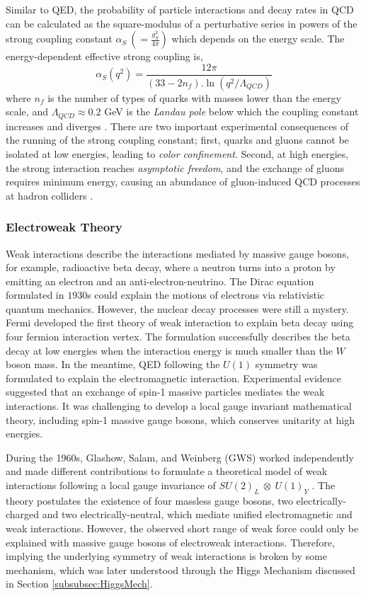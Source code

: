 Similar to QED, the probability of particle interactions and decay rates in QCD can be calculated as the square-modulus of a perturbative series in
powers of the strong coupling constant $\alpha _{S} ~(=\frac{g_{S}^2}{4\pi})$ which depends on the energy scale. The energy-dependent effective strong coupling is, 
\begin{equation}
    \alpha_{S}(q^2) = \frac{12\pi}{(33-2n_{f}).\ln(q^2/\Lambda_{QCD})}
\end{equation}
where $n_{f}$ is the number of types of quarks with masses lower than the energy scale, and $\Lambda_{QCD}\approx0.2$ GeV is the \textit{Landau pole} below which the coupling constant increases and diverges \cite{AlphaQCD}. There are two important experimental consequences of the running of the strong coupling constant; first, quarks and gluons cannot be isolated at low energies, leading to \textit{color confinement}. Second, at high energies, the strong interaction reaches \textit{asymptotic freedom}, and the exchange of gluons requires minimum energy, causing an abundance of gluon-induced QCD processes at hadron colliders \cite{AlphaQCD}. 

\subsubsection{Electroweak Theory}
\label{subsubsec:EWkUni}
Weak interactions describe the interactions mediated by massive gauge bosons, for example, radioactive beta decay, where a neutron turns into a proton by emitting an electron and an anti-electron-neutrino. The Dirac equation formulated in $1930$s could explain the motions of electrons via relativistic quantum mechanics. However, the nuclear decay processes were still a mystery. Fermi developed the first theory of weak interaction to explain beta decay using four fermion interaction vertex. The formulation successfully describes the beta decay at low energies when the interaction energy is much smaller than the $W$ boson mass. In the meantime, QED following the $U(1)$ symmetry was formulated to explain the electromagnetic interaction. Experimental evidence suggested that an exchange of spin-1 massive particles mediates the weak interactions. It was challenging to develop a local gauge invariant mathematical theory, including spin-1 massive gauge bosons, which conserves unitarity at high energies. 

During the 1960s, Glashow, Salam, and Weinberg (GWS) worked independently and made different contributions to formulate a theoretical model of weak interactions following a local gauge invariance of $SU(2)_{L}~\otimes~U(1)_{Y}$ \cite{GLASHOW1961579}\cite{EWK_W}\cite{EWK_S}. The theory postulates the existence of four massless gauge bosons, two electrically-charged and two electrically-neutral, which mediate unified electromagnetic and weak interactions. However, the observed short range of weak force could only be explained with massive gauge bosons of electroweak interactions. Therefore, implying the underlying symmetry of weak interactions is broken by some mechanism, which was later understood through the Higgs Mechanism discussed in Section \ref{subsubsec:HiggsMech}. 

